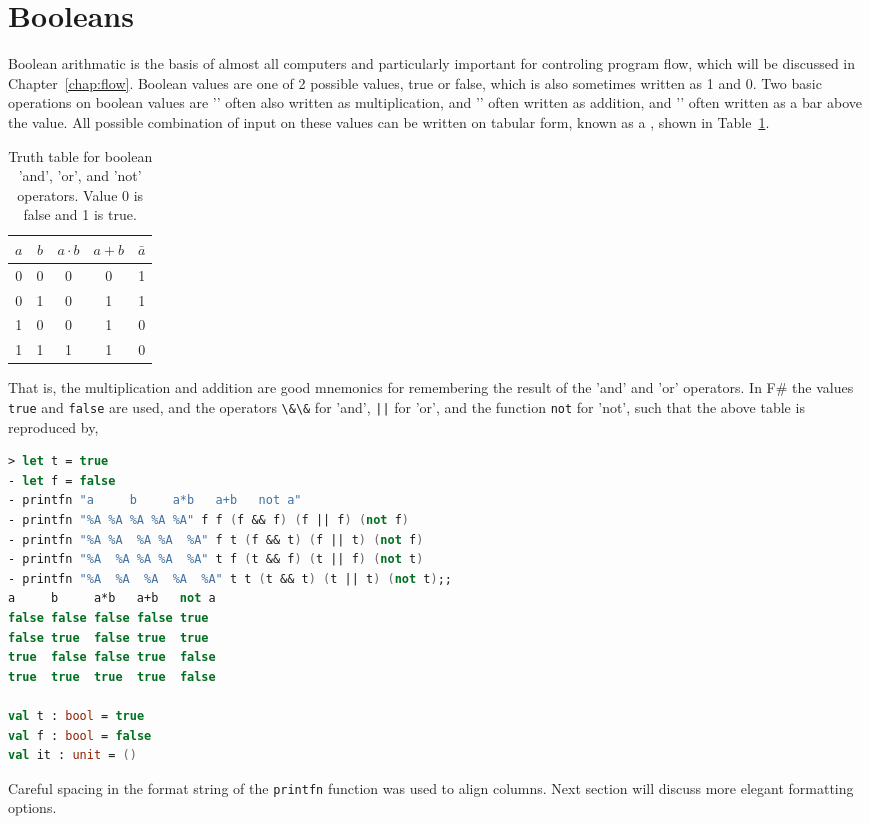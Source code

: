 \section{Booleans}
Boolean arithmatic is the basis of almost all computers and particularly important for controling program flow, which will be discussed in Chapter~\ref{chap:flow}. Boolean values are one of 2 possible values, true or false, which is also sometimes written as 1 and 0. Two basic operations on boolean values are '' often also written as multiplication, and '' often written as addition, and '' often written as a bar above the value. All possible combination of input on these values can be written on tabular form, known as a , shown in Table~\ref{tab:truthTable}.
\begin{table}
  \centering
  \begin{tabular}{|c|c|c|c|c|}
    \hline
    $a$ & $b$ & $a\cdot b$& $a + b$&$\bar{a}$\\
    \hline
    0&0&0&0&1\\
    0&1&0&1&1\\
    1&0&0&1&0\\
    1&1&1&1&0\\
    \hline
  \end{tabular}
  \caption{Truth table for boolean 'and', 'or', and 'not' operators. Value 0 is false and 1 is true.}
  \label{tab:truthTable}
\end{table}
That is, the multiplication and addition are good mnemonics for remembering the result of the 'and' and 'or' operators. In F\# the values \lstinline|true| and \lstinline|false| are used, and the operators \lstinline|\&\&| for 'and', \lstinline+||+ for 'or', and the function \lstinline|not| for 'not', such that the above table is reproduced by,
\begin{lstlisting}[language=fsharp,caption={fsharpi}]
> let t = true
- let f = false
- printfn "a     b     a*b   a+b   not a"                                       
- printfn "%A %A %A %A %A" f f (f && f) (f || f) (not f)
- printfn "%A %A  %A %A  %A" f t (f && t) (f || t) (not f)
- printfn "%A  %A %A %A  %A" t f (t && f) (t || f) (not t)
- printfn "%A  %A  %A  %A  %A" t t (t && t) (t || t) (not t);;
a     b     a*b   a+b   not a
false false false false true
false true  false true  true
true  false false true  false
true  true  true  true  false

val t : bool = true
val f : bool = false
val it : unit = ()
\end{lstlisting}
Careful spacing in the format string of the \lstinline|printfn| function was used to align columns. Next section will discuss more elegant formatting options.

